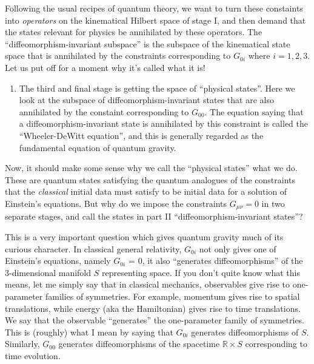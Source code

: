 \documentclass{article}
\def\tightlist{}
\begin{document}
Following the usual recipes of quantum theory, we want to turn these
constaints into \emph{operators} on the kinematical Hilbert space of
stage I, and then demand that the states relevant for physics be
annihilated by these operators. The ``diffeomorphism-invariant
subspace'' is the subspace of the kinematical state space that is
annihilated by the constraints corresponding to \(G_{0i}\) where
\(i = 1, 2, 3\). Let us put off for a moment why it's called what it is!

\begin{enumerate}
\def\labelenumi{\Roman{enumi})}
\setcounter{enumi}{2}
\tightlist
\item
  The third and final stage is getting the space of ``physical states''.
  Here we look at the subspace of diffeomorphism-invariant states that
  are also annihilated by the constaint corresponding to \(G_{00}\). The
  equation saying that a diffeomorphism-invariant state is annihilated
  by this constraint is called the ``Wheeler-DeWitt equation'', and this
  is generally regarded as the fundamental equation of quantum gravity.
\end{enumerate}

Now, it should make some sense why we call the ``physical states'' what
we do. These are quantum states satisfying the quantum analogues of the
constraints that the \emph{classical} initial data must satisfy to be
initial data for a solution of Einstein's equations. But why do we
impose the constraints \(G_{\mu \nu} = 0\) in two separate stages, and
call the states in part II ``diffeomorphism-invariant states''?

This is a very important question which gives quantum gravity much of
its curious character. In classical general relativity, \(G_{0i}\) not
only gives one of Einstein's equations, namely \(G_{0i}\) = 0, it also
``generates diffeomorphisms'' of the 3-dimensional manifold \(S\)
representing space. If you don't quite know what this means, let me
simply say that in classical mechanics, observables give rise to
one-parameter families of symmetries. For example, momentum gives rise
to spatial translations, while energy (aka the Hamiltonian) gives rise
to time translations. We say that the observable ``generates'' the
one-parameter family of symmetries. This is (roughly) what I mean by
saying that \(G_{0i}\) generates diffeomorphisms of \(S\). Similarly,
\(G_{00}\) generates diffeomorphisms of the spacetime
\(\mathbb{R} \times S\) corresponding to time evolution.
\end{document}

